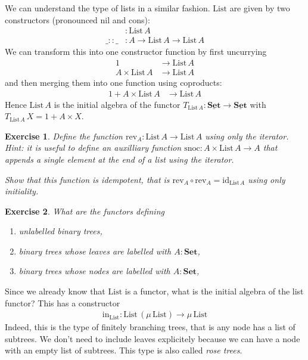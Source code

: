 \documentclass{article}
\newcommand{\Set}{\mathbf{Set}}
\newcommand{\cat}[1]{\underline{\mathbf{#1}}}
\newcommand{\id}{\mathrm{id}}
\newcommand{\List}{\mathrm{List}}
\newcommand{\rev}{\mathrm{rev}}
\newcommand{\inn}{\mathrm{in}}
\newcommand{\cons}{:\!\!:}
\newtheorem{exercise}{Exercise}
\begin{document}
We can understand the type of lists in a similar fashion. $\List$ are given by two constructors (pronounced nil and cons):
\begin{align*}
[] & : \List\,A \\
\_\cons\_ & : A \to \List\,A \to \List\,A
\end{align*}
We can transform this into one constructor function by first uncurrying
\begin{align*}
1 & \to \List\,A \\
A \times \List\,A & \to \List\,A
\end{align*}
and then merging them into one function using coproducts:
\begin{align*}
1 + A \times \List\,A & \to \List\,A
\end{align*}
Hence $\List\,A$ is the initial algebra of the functor $T_{\List\,A}:\cat{\Set} \to \cat{\Set}$ with $T_{\List\,A}\,X = 1 + A \times X$.
\begin{exercise}
Define the function $\rev_A : \List\,A \to \List\,A$ using only the iterator. \emph{Hint:} it is useful to define an auxilliary function 
$\mathrm{snoc} : A \times\List\,A \to A$ that appends a single element at the end of a list using the iterator. 

Show that this function is idempotent, that is $\rev_A \circ \rev_A = \id_{\List\,A}$ using only initiality. 
\end{exercise}

\begin{exercise}
What are the functors defining 
\begin{enumerate}
\item unlabelled binary trees,
\item binary trees whose leaves are labelled with $A:\Set$,
\item binary trees whose nodes  are labelled with $A:\Set$,
\end{enumerate}
\end{exercise}

Since we already know that $\List$ is a functor, what is the initial algebra of the list functor? This has a constructor
\begin{align*}
\inn_\List : \List \,(\mu\,\List) \to \mu\,\List
\end{align*}
Indeed, this is the type of finitely branching trees, that is any node has a list of subtrees. We don't need to include leaves explicitely because we can have a node with an empty list of subtrees. This type is also called \emph{rose trees}.
\end{document}

